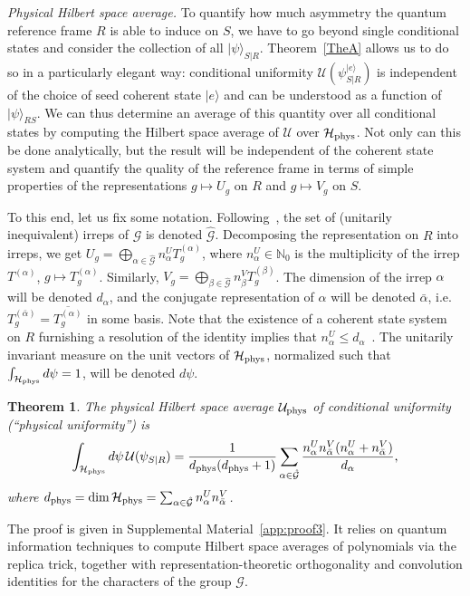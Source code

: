 \documentclass[aps,10pt,twocolumn,showpacs,pra,citeautoscript,amsmath,amssymb,floatfix,superscriptaddress]{revtex4-1}
\newtheorem{theorem}{Theorem}
\def\dim{{\mathrm{dim}}}
\begin{document}
\emph{Physical Hilbert space average.} To quantify how much asymmetry the quantum reference frame $R$ is able to induce on $S$, we have to go beyond single conditional states and consider the collection of all $|\psi\rangle_{S|R}$. Theorem~\ref{TheA} allows us to do so in a particularly elegant way: conditional uniformity $\mathcal{U}(\psi_{S|R}^{|e\rangle})$ is independent of the choice of seed coherent state $|e\rangle$ and can be understood as a function of $|\psi\rangle_{RS}$. We can thus determine an average of this quantity over all conditional states by computing the Hilbert space average of $\mathcal{U}$ over $\mathcal{H}_{\rm phys}$. Not only can this be done analytically, but the result will be independent of the coherent state system and quantify the quality of the reference frame in terms of simple properties of the representations $g\mapsto U_g$ on $R$ and $g\mapsto V_g$ on $S$.

To this end, let us fix some notation. Following~\cite{Simon}, the set of (unitarily inequivalent) irreps of $\mathcal{G}$ is denoted $\mathcal{\hat G}$. Decomposing the representation on $R$ into irreps, we get $U_g=\bigoplus_{\alpha\in\mathcal{\hat G}}n^U_\alpha T_g^{(\alpha)}$, where $n_\alpha^U\in \mathbb{N}_0$ is the multiplicity of the irrep $T^{(\alpha)}$, $g\mapsto T_g^{(\alpha)}$. Similarly, $V_g=\bigoplus_{\beta\in\mathcal{\hat G}}n_\beta^V T_g^{(\beta)}$. The dimension of the irrep $\alpha$ will be denoted $d_\alpha$, and the conjugate representation of $\alpha$ will be denoted $\bar\alpha$, i.e.\ $T_g^{(\bar\alpha)}=\overline{T_g^{(\alpha)}}$ in some basis. Note that the existence of a coherent state system on $R$ furnishing a resolution of the identity implies that $n_\alpha^U\leq d_\alpha$~\cite{DGHLM21}. The unitarily invariant measure on the unit vectors of $\mathcal{H}_{\rm phys}$, normalized such that $\int_{\mathcal{H}_{\rm phys}}d\psi=1$, will be denoted $d\psi$.
\begin{theorem}
\label{TheAvg}
The physical Hilbert space average $\mathcal{U}_{\rm phys}$ of conditional uniformity (``physical uniformity'') is
\[
   \int_{\mathcal{H}_{\rm phys}} d\psi\,\mathcal{U}(\psi_{S|R})=\frac 1 {d_{\rm phys}(d_{\rm phys}+1)}\sum_{\alpha\in\mathcal{\hat G}} \frac{n_\alpha^U n_{\bar\alpha}^V(n_\alpha^U+n_{\bar\alpha}^V)}{d_\alpha},
\]
where $d_{\rm phys}=\dim\,\mathcal{H}_{\rm phys}=\sum_{\alpha\in\mathcal{\hat G}} n_\alpha^U n_{\bar\alpha}^V$.
\end{theorem}
The proof is given in Supplemental Material~\ref{app:proof3}. It relies on quantum information techniques to compute Hilbert space averages of polynomials via the replica trick, together with representation-theoretic orthogonality and convolution identities for the characters of the group $\mathcal{G}$.
\end{document}
